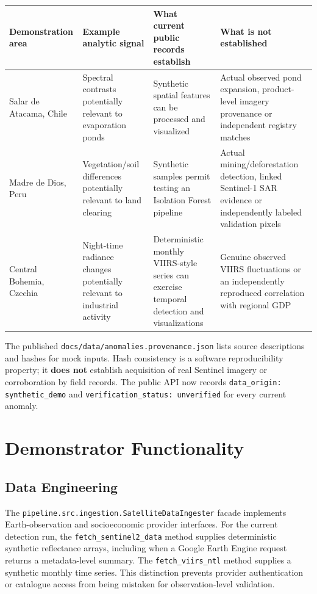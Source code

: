 \begin{table}[h]
\centering
\begin{tabular}{llll}
\toprule
Demonstration area & Example analytic signal & What current public records establish & What is not established \\
\midrule
Salar de Atacama, Chile & Spectral contrasts potentially relevant to evaporation ponds & Synthetic spatial features can be processed and visualized & Actual observed pond expansion, product-level imagery provenance or independent registry matches \\
Madre de Dios, Peru & Vegetation/soil differences potentially relevant to land clearing & Synthetic samples permit testing an Isolation Forest pipeline & Actual mining/deforestation detection, linked Sentinel-1 SAR evidence or independently labeled validation pixels \\
Central Bohemia, Czechia & Night-time radiance changes potentially relevant to industrial activity & Deterministic monthly VIIRS-style series can exercise temporal detection and visualizations & Genuine observed VIIRS fluctuations or an independently reproduced correlation with regional GDP \\
\bottomrule
\end{tabular}
\end{table}
The published \texttt{docs/data/anomalies.provenance.json} lists source descriptions and hashes for mock inputs. Hash consistency is a software reproducibility property; it \textbf{does not} establish acquisition of real Sentinel imagery or corroboration by field records. The public API now records \texttt{data\_origin: synthetic\_demo} and \texttt{verification\_status: unverified} for every current anomaly.

\section{Demonstrator Functionality}

\subsection{Data Engineering}

The \texttt{pipeline.src.ingestion.SatelliteDataIngester} facade implements Earth-observation and socioeconomic provider interfaces. For the current detection run, the \texttt{fetch\_sentinel2\_data} method supplies deterministic synthetic reflectance arrays, including when a Google Earth Engine request returns a metadata-level summary. The \texttt{fetch\_viirs\_ntl} method supplies a synthetic monthly time series. This distinction prevents provider authentication or catalogue access from being mistaken for observation-level validation.

